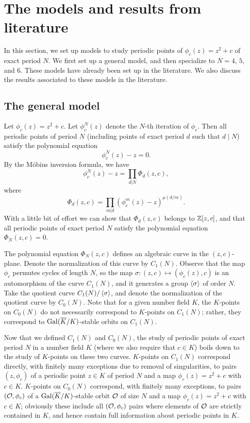 \section{The models and results from literature}
\label{sec:model}

In this section, we set up models to study periodic points of
$\phi_c(z) = z^2 + c$ of exact period $N$. We first set up a general
model, and then specialize to $N = 4$, $5$, and $6$. These models have
already been set up in the literature. We also discuss the results
associated to these models in the literature.

\subsection{The general model}
\label{subsec:model-general}

Let $\phi_c(z) = z^2 + c$. Let $\phi_c^N(z)$ denote the $N$-th
iteration of $\phi_c$. Then all periodic points of period $N$
(including points of exact period $d$ such that $d \mid N$) satisfy
the polynomial equation
\[
\phi_c^N(z) - z = 0.
\]
By the M\"obius inversion formula, we have
\[
\phi_c^N(z) - z = \prod_{d|N} \Phi_d(z, c),
\]
where
\[
\Phi_d(z, c) = \prod_{m|d}(\phi_c^m(z) - z)^{\mu(d/m)}.
\]
With a little bit of effort we can show that $\Phi_d(z, c)$ belongs to
$\mathbb{Z}[z, c]$, and that all periodic points of exact period $N$ satisfy
the polynomial equation $\Phi_N(z, c) = 0$.

The polynomial equation $\Phi_N(z, c)$ defines an algebraic curve in
the $(z, c)$-plane. Denote the normalization of this curve by
$C_1(N)$. Observe that the map $\phi_c$ permutes cycles of length $N$,
so the map $\sigma: (z, c) \mapsto (\phi_c(z), c)$ is an automorphism
of the curve $C_1(N)$, and it generates a group $\left<\sigma\right>$ of
order $N$. Take the quotient curve $C_1(N)/\left<\sigma\right>$, and denote
the normalization of the quotient curve by $C_0(N)$. Note that for a
given number field $K$, the $K$-points on $C_0(N)$ do not necessarily
correspond to $K$-points on $C_1(N)$; rather, they correspond to
$\mathrm{Gal}(\overline{K}/K)$-stable orbits on $C_1(N)$.

Now that we defined $C_1(N)$ and $C_0(N)$, the study of periodic
points of exact period $N$ in a number field $K$ (where we also
require that $c \in K$) boils down to the study of $K$-points on these
two curves. $K$-points on $C_1(N)$ correspond directly, with finitely
many exceptions due to removal of singularities, to pairs $(z,
\phi_c)$ of a periodic point $z \in K$ of period $N$ and a map
$\phi_c(z) = z^2 + c$ with $c \in K$. $K$-points on $C_0(N)$
correspond, with finitely many exceptions, to pairs $(\mathcal{O}, \phi_c)$ of
a $\mathrm{Gal}(\overline{K}/K)$-stable orbit $\mathcal{O}$ of size $N$ and a map $\phi_c(z)
= z^2 + c$ with $c \in K$; obviously these include all $(\mathcal{O}, \phi_c)$
pairs where elements of $\mathcal{O}$ are strictly contained in $K$, and hence
contain full information about periodic points in $K$.

